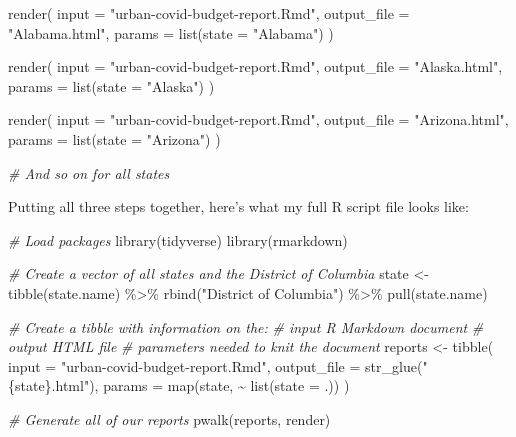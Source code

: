 \documentclass[
]{book}
\newenvironment{Shaded}{\begin{snugshade}}{\end{snugshade}}
\newcommand{\AttributeTok}[1]{\textcolor[rgb]{0.77,0.63,0.00}{#1}}
\newcommand{\CommentTok}[1]{\textcolor[rgb]{0.56,0.35,0.01}{\textit{#1}}}
\newcommand{\FunctionTok}[1]{\textcolor[rgb]{0.00,0.00,0.00}{#1}}
\newcommand{\NormalTok}[1]{#1}
\newcommand{\OtherTok}[1]{\textcolor[rgb]{0.56,0.35,0.01}{#1}}
\newcommand{\SpecialCharTok}[1]{\textcolor[rgb]{0.00,0.00,0.00}{#1}}
\newcommand{\StringTok}[1]{\textcolor[rgb]{0.31,0.60,0.02}{#1}}
\begin{document}
\begin{Shaded}
\begin{Highlighting}[]
\FunctionTok{render}\NormalTok{(}
\AttributeTok{input =} \StringTok{"urban{-}covid{-}budget{-}report.Rmd"}\NormalTok{,}
\AttributeTok{output\_file =} \StringTok{"Alabama.html"}\NormalTok{,}
\AttributeTok{params =} \FunctionTok{list}\NormalTok{(}\AttributeTok{state =} \StringTok{"Alabama"}\NormalTok{)}
\NormalTok{)}

\FunctionTok{render}\NormalTok{(}
\AttributeTok{input =} \StringTok{"urban{-}covid{-}budget{-}report.Rmd"}\NormalTok{,}
\AttributeTok{output\_file =} \StringTok{"Alaska.html"}\NormalTok{,}
\AttributeTok{params =} \FunctionTok{list}\NormalTok{(}\AttributeTok{state =} \StringTok{"Alaska"}\NormalTok{)}
\NormalTok{)}

\FunctionTok{render}\NormalTok{(}
\AttributeTok{input =} \StringTok{"urban{-}covid{-}budget{-}report.Rmd"}\NormalTok{,}
\AttributeTok{output\_file =} \StringTok{"Arizona.html"}\NormalTok{,}
\AttributeTok{params =} \FunctionTok{list}\NormalTok{(}\AttributeTok{state =} \StringTok{"Arizona"}\NormalTok{)}
\NormalTok{)}

\CommentTok{\# And so on for all states}
\end{Highlighting}
\end{Shaded}

Putting all three steps together, here's what my full R script file looks like:

\begin{Shaded}
\begin{Highlighting}[]
\CommentTok{\# Load packages}
\FunctionTok{library}\NormalTok{(tidyverse)}
\FunctionTok{library}\NormalTok{(rmarkdown)}

\CommentTok{\# Create a vector of all states and the District of Columbia}
\NormalTok{state }\OtherTok{\textless{}{-}} \FunctionTok{tibble}\NormalTok{(state.name) }\SpecialCharTok{\%\textgreater{}\%}
\FunctionTok{rbind}\NormalTok{(}\StringTok{"District of Columbia"}\NormalTok{) }\SpecialCharTok{\%\textgreater{}\%}
\FunctionTok{pull}\NormalTok{(state.name)}

\CommentTok{\# Create a tibble with information on the:}
\CommentTok{\# input R Markdown document}
\CommentTok{\# output HTML file}
\CommentTok{\# parameters needed to knit the document}
\NormalTok{reports }\OtherTok{\textless{}{-}} \FunctionTok{tibble}\NormalTok{(}
\AttributeTok{input =} \StringTok{"urban{-}covid{-}budget{-}report.Rmd"}\NormalTok{,}
\AttributeTok{output\_file =} \FunctionTok{str\_glue}\NormalTok{(}\StringTok{"\{state\}.html"}\NormalTok{),}
\AttributeTok{params =} \FunctionTok{map}\NormalTok{(state, }\SpecialCharTok{\textasciitilde{}} \FunctionTok{list}\NormalTok{(}\AttributeTok{state =}\NormalTok{ .))}
\NormalTok{)}

\CommentTok{\# Generate all of our reports}
\FunctionTok{pwalk}\NormalTok{(reports, render)}
\end{Highlighting}
\end{Shaded}
\end{document}

